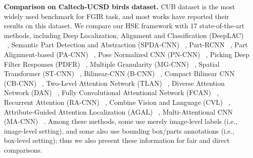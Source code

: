 \documentclass[sigconf]{acmart}
\begin{document}
\noindent\textbf{Comparison on Caltech-UCSD birds dataset. } CUB dataset is the most widely used benchmark for FGIR task, and most works have reported their results on this dataset. We compare our HSE framework with 17 state-of-the-art methods, including Deep Localization, Alignment and Classification (DeepLAC) ~\cite{lin2015deep}, Semantic Part Detection and Abstraction (SPDA-CNN) ~\cite{zhang2016spda}, Part-RCNN ~\cite{zhang2014part}, Part Alignment-based (PA-CNN) ~\cite{krause2015fine}, Pose Normalized CNN (PN-CNN) ~\cite{branson2014bird}, Picking Deep Filter Responses (PDFR) ~\cite{zhang2016picking}, Multiple Granularity (MG-CNN) ~\cite{wang2015multiple}, Spatial Transformer (ST-CNN) ~\cite{jaderberg2015spatial}, Bilinear-CNN (B-CNN) ~\cite{lin2015bilinear}, Compact Bilinear CNN (CB-CNN) ~\cite{gao2016compact}, Two-Level Attention Network (TLAN) ~\cite{xiao2015application}, Diverse Attention Network (DAN) ~\cite{zhao2017diversified}, Fully Convolutional Attentional Network (FCAN) ~\cite{liu2016fully}, Recurrent Attention (RA-CNN) ~\cite{fu2017look}, Combine Vision and Language (CVL) ~\cite{he2017fine}, Attribute-Guided Attention Localization (AGAL) ~\cite{liu2017localizing}, Multi-Attentional CNN (MA-CNN) ~\cite{zheng2017learning}. Among these methods, some use merely image-level labels (i.e., image-level setting), and some also use bounding box/parts annotations (i.e., box-level setting); thus we also present these information for fair and direct comparisons. 
\end{document}
